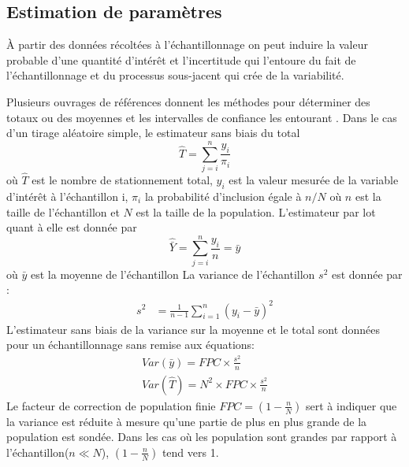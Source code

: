         \subsection{Estimation de paramètres}
            À partir des données récoltées à l'échantillonnage on peut induire la valeur probable d'une quantité d'intérêt et l'incertitude qui l'entoure du fait de l'échantillonnage et du processus sous-jacent qui crée de la variabilité. \par
            Plusieurs ouvrages de références donnent les méthodes pour déterminer des totaux ou des moyennes et les intervalles de confiance les entourant  \parencite{hines_probabilites_2005,tille_theorie_2019,ardilly_techniques_2006}.  Dans le cas d'un tirage aléatoire simple, le estimateur sans biais du total 
            \begin{equation}
                \hat{T} = \sum_{j=i}^n \frac{y_{i}}{\pi_i} 
            \end{equation} où $\hat{T}$ est le nombre de stationnement total, $y_{i}$ est la valeur mesurée de la variable d'intérêt à l'échantillon i, $\pi_{i}$ la probabilité d'inclusion égale à $n/N$ où $n$ est la taille de l'échantillon et $N$ est la taille de la population. L'estimateur par lot quant à elle est donnée par 
            \begin{equation}
                \hat{\bar{Y}} = \sum_{j=i}^n \frac{y_{i}}{n} = \bar{y}
            \end{equation}
            où $\bar{y}$ est la moyenne de l'échantillon
            La variance de l'échantillon $s^2$ \parencite{ardilly_techniques_2006}  est donnée par :
            \begin{align}
                s^2 &= \frac{1}{n-1}\sum_{i=1}^{n} \left(y_{i}-\bar{y}\right)^2
            \end{align}
            L'estimateur sans biais de la variance sur la moyenne et le total sont données pour un échantillonnage sans remise aux équations:
            \begin{align}
                Var(\bar{y}) = FPC \times \frac{s^2}{n}\\
                Var(\hat{T}) = N^2 \times FPC \times \frac{s^2}{n}
            \end{align}
            Le facteur de correction de population finie $FPC =\left(1-\frac{n}{N}\right)$ sert à indiquer que la variance est réduite à mesure qu'une partie de plus en plus grande de la population est sondée. Dans les cas où les population sont grandes par rapport à l'échantillon($n\ll N$), $\left(1-\frac{n}{N}\right)$ tend vers 1.  
